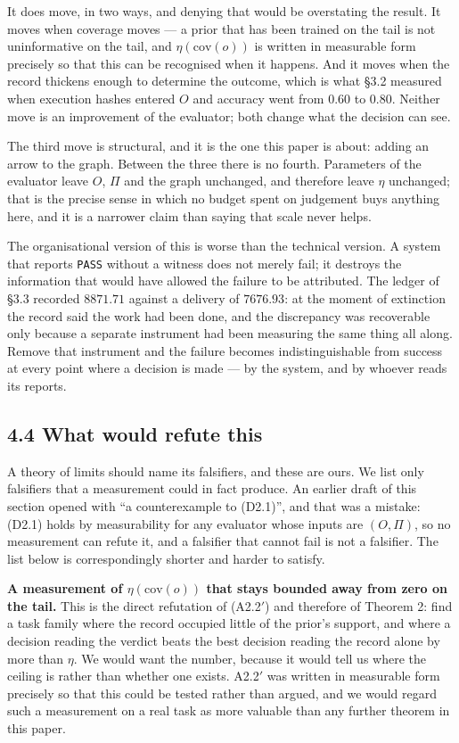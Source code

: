 \documentclass[11pt,a4paper]{article}
\begin{document}
It does move, in two ways, and denying that would be overstating the result. It
moves when coverage moves --- a prior that has been trained on the tail is not
uninformative on the tail, and \(\eta(\mathrm{cov}(o))\) is written in measurable
form precisely so that this can be recognised when it happens. And it moves when
the record thickens enough to determine the outcome, which is what §3.2 measured
when execution hashes entered \(O\) and accuracy went from \(0.60\) to \(0.80\). Neither
move is an improvement of the evaluator; both change what the decision can see.

The third move is structural, and it is the one this paper is about: adding an
arrow to the graph. Between the three there is no fourth. Parameters of the
evaluator leave \(O\), \(\Pi\) and the graph unchanged, and therefore leave \(\eta\)
unchanged; that is the precise sense in which no budget spent on judgement buys
anything here, and it is a narrower claim than saying that scale never helps.

The organisational version of this is worse than the technical version. A system
that reports \texttt{PASS} without a witness does not merely fail; it destroys the
information that would have allowed the failure to be attributed. The ledger of
§3.3 recorded \(8871.71\) against a delivery of \(7676.93\): at the moment of
extinction the record said the work had been done, and the discrepancy was
recoverable only because a separate instrument had been measuring the same thing
all along. Remove that instrument and the failure becomes indistinguishable from
success at every point where a decision is made --- by the system, and by whoever
reads its reports.

\subsection{4.4 What would refute this}\label{what-would-refute-this}

A theory of limits should name its falsifiers, and these are ours. We list only
falsifiers that a measurement could in fact produce. An earlier draft of this
section opened with ``a counterexample to (D2.1)'', and that was a mistake: (D2.1)
holds by measurability for any evaluator whose inputs are \((O,\Pi)\), so no
measurement can refute it, and a falsifier that cannot fail is not a falsifier. The
list below is correspondingly shorter and harder to satisfy.

\textbf{A measurement of \(\eta(\mathrm{cov}(o))\) that stays bounded away from zero on
the tail.} This is the direct refutation of (A2.2\('\)) and therefore of Theorem 2:
find a task family where the record occupied little of the prior's support, and
where a decision reading the verdict beats the best decision reading the record
alone by more than \(\eta\). We would want the number, because it would tell us where
the ceiling is rather than whether one exists. A2.2\('\) was written in measurable
form precisely so that this could be tested rather than argued, and we would regard
such a measurement on a real task as more valuable than any further theorem in this
paper.
\end{document}

